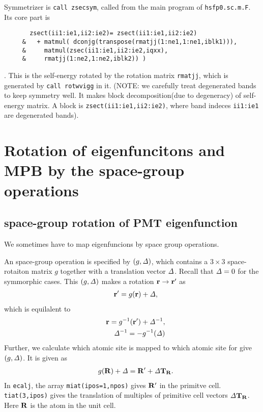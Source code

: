 \documentclass[a4paper,10pt,fleqn]{article}
\def\iDelta{{\it \Delta}}
\def\iDelta{{\it \Delta}}
\newcommand{\bfr}{{\bf r}}
\newcommand{\bfT}{{\bf T}}
\newcommand{\bfR}{{\bf R}}
\begin{document}
Symmetrizer is \verb#call zsecsym#, called from the main program of \verb#hsfp0.sc.m.F#.
Its core part is
\begin{verbatim}
       zsect(ii1:ie1,ii2:ie2)= zsect(ii1:ie1,ii2:ie2) 
     &   + matmul( dconjg(transpose(rmatjj(1:ne1,1:ne1,iblk1))), 
     &     matmul(zsec(ii1:ie1,ii2:ie2,iqxx),
     &     rmatjj(1:ne2,1:ne2,iblk2)) )
\end{verbatim}
. This is the self-energy rotated by the rotation matrix \verb#rmatjj#,
which is generated by \verb#call rotwvigg# in it.
(NOTE: we carefully treat degenerated bands to keep symmetry well.
It makes block decomposition(due to degeneracy) of self-energy matrix.
A block is \verb#zsect(ii1:ie1,ii2:ie2)#, where band indeces
\verb#ii1:ie1# are degenerated bands).


\section{Rotation of eigenfuncitons and MPB by the space-group operations}
\label{sec:spacegroupmapping}
\subsection{space-group rotation of PMT eigenfunction}

We sometimes have to map eigenfuncions by space group operations.

An space-group operation is specified by $(g,\iDelta)$, which contains
a $3 \times 3$ space-rotaiton matrix $g$ together with a translation vector
$\iDelta$. Recall that $\iDelta= 0$ for the symmorphic cases.
This $(g,\iDelta)$ makes a rotation $\bfr \to \bfr'$ as
\begin{eqnarray}
&&\bfr'=g(\bfr)+ \iDelta,
\end{eqnarray}
which is equilalent to
\begin{eqnarray}
&&\bfr=g^{-1}(\bfr')+ \iDelta^{-1},\\
&&\iDelta^{-1}=-g^{-1}(\iDelta)
\end{eqnarray}
Further, we calculate which atomic site is mapped to which
atomic site for give $(g,\iDelta)$. It is given as
\begin{eqnarray}
&&g(\bfR)+\iDelta=\bfR'+\iDelta \bfT_\bfR.
\end{eqnarray}
In {\tt ecalj}, the array {\tt miat(ipos=1,npos)} gives ${\bf R}'$ in
the primitve cell. 
{\tt tiat(3,ipos)} gives the translation of multiples of primitive cell vectors 
$\iDelta \bfT_\bfR$. Here $\bfR$ is the atom in the unit cell. 
\end{document}

